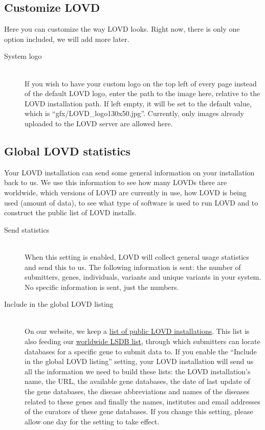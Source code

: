 \documentclass[a4paper,oneside,openany,12pt]{memoir}
\begin{document}
\subsection{Customize LOVD}
Here you can customize the way LOVD looks.
Right now, there is only one option included, we will add more later.
\begin{description}
  \item[System logo] \hfill \\
  If you wish to have your custom logo on the top left of every page instead of the default LOVD logo,
   enter the path to the image here, relative to the LOVD installation path.
  If left empty, it will be set to the default value, which is ``gfx/LOVD\_logo130x50.jpg''.
  Currently, only images already uploaded to the LOVD server are allowed here.
\end{description}



\pagebreak[0] %
\subsection{Global LOVD statistics}
Your LOVD installation can send some general information on your installation back to us.
We use this information to see how many LOVDs there are worldwide, which versions of LOVD are currently in use,
 how LOVD is being used (amount of data), to see what type of software is used to run LOVD and to construct the public list of LOVD installs.
\begin{description}
  \item[Send statistics] \hfill \\
  When this setting is enabled, LOVD will collect general usage statistics and send this to us.
  The following information is sent: the number of submitters, genes, individuals, variants and unique variants in your system.
  No specific information is sent, just the numbers.
  \item[Include in the global LOVD listing] \hfill \\ %
  On our website, we keep a \href{http://www.lovd.nl/2.0/index_list.php}{list of public LOVD installations}.
  This list is also feeding our \href{http://www.lovd.nl/LSDBs}{worldwide LSDB list},
   through which submitters can locate databases for a specific gene to submit data to.
  If you enable the ``Include in the global LOVD listing'' setting, your LOVD installation will send us all the information we need to build these lists:
   the LOVD installation's name, the URL, the available gene databases, the date of last update of the gene databases,
   the disease abbreviations and names of the diseases related to these genes and finally the names,
   institutes and email addresses of the curators of these gene databases.
  If you change this setting, please allow one day for the setting to take effect.
\end{description}
\end{document}
